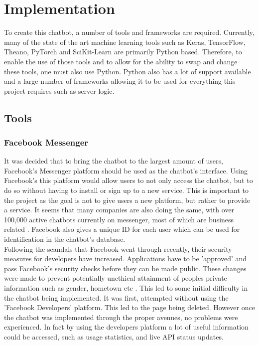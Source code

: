 \documentclass[12pt,a4paper]{article}
\begin{document}
    \section{Implementation}
    \label{section:implementation}
    To create this chatbot, a number of tools and frameworks are required. Currently, many of the state of the art machine learning tools such as Keras, TensorFlow, Theano, PyTorch and SciKit-Learn are primarily Python based. Therefore, to enable the use of those tools and to allow for the ability to swap and change these tools, one must also use Python. Python also has a lot of support available and a large number of frameworks allowing it to be used for everything this project requires such as server logic.
    
    \subsection{Tools}
    \subsubsection*{Facebook Messenger}
    It was decided that to bring the chatbot to the largest amount of users, Facebook's Messenger platform should be used as the chatbot's interface. Using Facebook's this platform would allow users to not only access the chatbot, but to do so without having to install or sign up to a new service. This is important to the project as the goal is not to give users a new platform, but rather to provide a service. It seems that many companies are also doing the same, with over 100,000 active chatbots currently on messenger, most of which are business related \citep{Parr17}. Facebook also gives a unique ID for each user which can be used for identification in the chatbot's database. \\
    
    Following the scandals that Facebook went through recently, their security measures for developers have increased. Applications have to be 'approved' and pass Facebook's security checks before they can be made public. These changes were made to prevent potentially unethical attainment of peoples private information such as gender, hometown etc \citep{Perez18}. This led to some initial difficulty in the chatbot being implemented. It was first, attempted without using the 'Facebook Developers' platform. This led to the page being deleted. However once the chatbot was implemented through the proper avenues, no problems were experienced. In fact by using the developers platform a lot of useful information could be accessed, such as usage statistics, and live API status updates.
    
\end{document}
